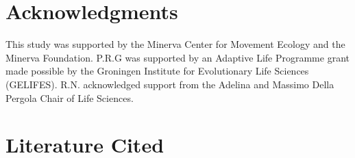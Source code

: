\begin{refsection}
\section*{Acknowledgments}

This study was supported by the Minerva Center for Movement Ecology and the Minerva Foundation. 
P.R.G was supported by an Adaptive Life Programme grant made possible by the Groningen Institute for Evolutionary Life Sciences (GELIFES).
R.N. acknowledged support from the Adelina and Massimo Della Pergola Chair of Life Sciences.

\newrefcontext[sorting=nyt]
\section*{Literature Cited}
\printbibliography[title={Literature~Cited},heading=none]
\end{refsection}